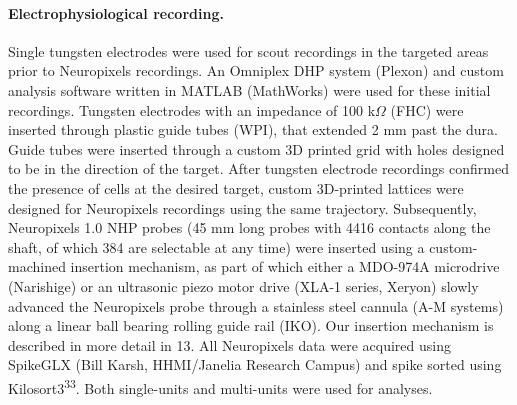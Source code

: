 \documentclass{article}
\begin{document}
\paragraph{Electrophysiological recording.} Single tungsten electrodes were used for scout recordings in the targeted areas prior to Neuropixels recordings. An Omniplex DHP system (Plexon) and custom analysis software written in MATLAB (MathWorks) were used for these initial recordings. Tungsten electrodes with an impedance of 100 k$\Omega$ (FHC) were inserted through plastic guide tubes (WPI), that extended 2 mm past the dura. Guide tubes were inserted through a custom 3D printed grid with holes designed to be in the direction of the target. After tungsten electrode recordings confirmed the presence of cells at the desired target, custom 3D-printed lattices were designed for Neuropixels recordings using the same trajectory. Subsequently, Neuropixels 1.0 NHP probes (45 mm long probes with 4416 contacts along the shaft, of which 384 are selectable at any time) were inserted using a custom-machined insertion mechanism, as part of which either a MDO-974A microdrive (Narishige) or an ultrasonic piezo motor drive (XLA-1 series, Xeryon) slowly advanced the Neuropixels probe through a stainless steel cannula (A-M systems) along a linear ball bearing rolling guide rail (IKO). Our insertion mechanism is described in more detail in 13. All Neuropixels data were acquired using SpikeGLX (Bill Karsh, HHMI/Janelia Research Campus) and spike sorted using Kilosort3\textsuperscript{33}. Both single-units and multi-units were used for analyses.
\end{document}
